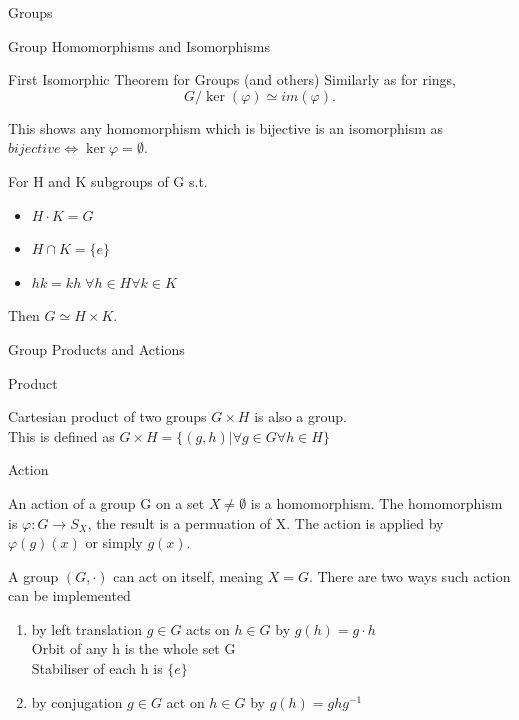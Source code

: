 \documentclass[12pt, letterpaper]{article}
\begin{document}
\begin{section}{Groups}
\begin{subsection}{Group Homomorphisms and Isomorphisms}
\begin{subsubsection}{First Isomorphic Theorem for Groups (and others)}
      Similarly as for rings, \[G / \ker(\varphi) \simeq im(\varphi).\]

      This shows any homomorphism which is bijective is an isomorphism as
      \(bijective \iff \ker{\varphi} = \emptyset\).

      For H and K subgroups of G s.t.
      \begin{itemize}
        \item \(H \cdot K = G\)
        \item \(H \cap K = \{ e \}\)
        \item \(hk = kh \; \forall h \in H \forall k \in K\)
      \end{itemize}
      Then \(G \simeq H \times K\).

    \end{subsubsection}

  \end{subsection}

  \begin{subsection}{Group Products and Actions}

    \begin{subsubsection}{Product}

      Cartesian product of two groups \(G \times H\) is also a group. \\
      This is defined as \(G \times H = \{ (g, h) | \forall g \in G \forall h \in H \}\)

    \end{subsubsection}

    \begin{subsubsection}{Action}

      An action of a group G on a set \(X \neq \emptyset\) is a homomorphism.
      The homomorphism is \(\varphi : G \to S_{X}\), the result is a permuation
      of X. The action is applied by \(\varphi(g)(x)\) or simply \(g(x)\).

      A group \((G, \cdot)\) can act on itself, meaing \(X = G\).  There are two
      ways such action can be implemented
      \begin{enumerate}
        \item by left translation \(g \in G\) acts on \(h \in G\) by
              \(g(h) = g \cdot h\) \\
              Orbit of any h is the whole set G \\
              Stabiliser of each h is \(\{ e \}\)
        \item by conjugation \(g \in G\) act on \(h \in G\) by
              \(g(h) = ghg^{-1}\)
      \end{enumerate}


\end{subsubsection}
\end{subsection}
\end{section}
\end{document}
